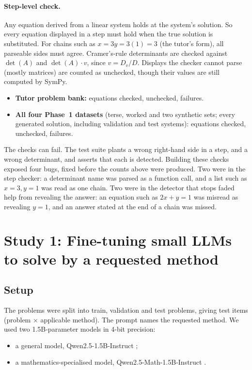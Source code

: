 \documentclass[11pt,a4paper]{article}
\begin{document}
\paragraph{Step-level check.}
Any equation derived from a linear system holds at the system's solution. So every equation
displayed in a step must hold when the true solution is substituted. For chains such as
$x = 3y = 3(1) = 3$ (the tutor's form), all parseable sides must agree. Cramer's-rule determinants are checked
against $\det(A)$ and $\det(A)\cdot v$, since $v = D_v/D$. Displays the checker cannot parse
(mostly matrices) are counted as unchecked, though their values are still computed by SymPy.
\begin{itemize}
  \item \textbf{Tutor problem bank:} \numBankStepChecked{} equations checked, \numBankStepUnchecked{}
        unchecked, \numBankStepFailures{} failures.
  \item \textbf{All four Phase~1 datasets} (terse, worked and two synthetic sets; every
        generated solution, including validation and test systems):
        \numPhaseOneStepChecked{} equations checked, \numPhaseOneStepUnchecked{} unchecked,
        \numPhaseOneStepFailures{} failures.
\end{itemize}
The checks can fail. The test suite plants a wrong right-hand side in a step, and a wrong
determinant, and asserts that each is detected. Building these checks exposed four bugs,
fixed before the counts above were produced. Two were in the step checker: a determinant
name was parsed as a function call, and a list such as $x=3, y=1$ was read as one chain.
Two were in the detector that stops faded help from revealing the answer: an equation such
as $2x+y=1$ was misread as revealing $y=1$, and an answer stated at the end of a chain was
missed.

\section{Study 1: Fine-tuning small LLMs to solve by a requested method}
\label{sec:study1}

\subsection{Setup}
The \numSystemsEmitted{} problems were split into \numSplitTrain{} train, \numSplitValid{}
validation and \numSplitTest{} test problems, giving \numTestItems{} test items (problem
$\times$ applicable method). The prompt names the requested method. We used two 1.5B-parameter models in 4-bit
precision:
\begin{itemize}
  \item a general model, Qwen2.5-1.5B-Instruct \citep{qwen2024qwen25};
  \item a mathematics-specialised model, Qwen2.5-Math-1.5B-Instruct \citep{yang2024qwen25math}.
\end{itemize}
\end{document}
